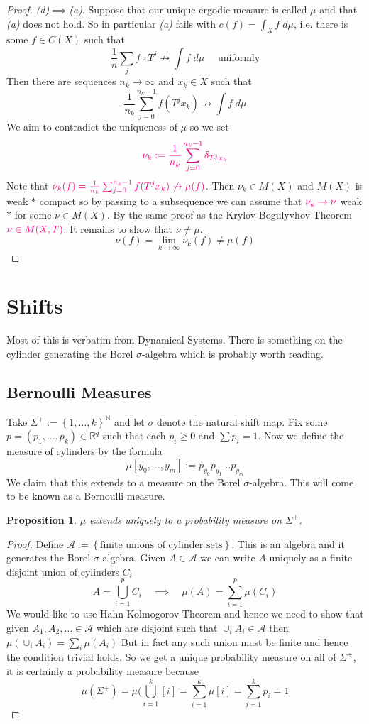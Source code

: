 \documentclass[11pt]{article}
\newcommand{\defeq}{:=}
\newcommand{\R}{\mathbb{R}}
\newcommand{\N}{\mathbb{N}}
\newcommand{\dm}{\;d\mu}
\newcommand{\mdf}[1]{{\color{RoyalBlue} #1}}
\newcommand{\highlight}[1]{{\color{RubineRed} #1}}
\newtheorem{prop}{Proposition}[section]
\begin{document}
\begin{proof}
\textit{(d)}$\implies$\textit{(a)}.
Suppose that our unique ergodic measure is called $\mu$ and that \textit{(a)} does not hold.
So in particular \textit{(a)} fails with $c(f) = \int_X f \dm$, i.e. \highlight{there is some $f\in C(X)$} such that
\[
	\frac{1}{n}\sum_{j}f\circ T^j \not \to \int f \dm \quad\text{ uniformly}
\]
Then there are \highlight{sequences $n_k\to \infty$ and $x_k\in X$} such that
\[
	\frac{1}{n_k}\sum_{j=0}^{n_k-1}f(T^jx_k) \not \to \int f \dm
\]
We aim to contradict the uniqueness of $\mu$ so we set 
\[
	\highlight{\nu_k \defeq \frac{1}{n_k}\sum_{j=0}^{n_k-1}\delta_{T^jx_k}}
\]
Note that $\highlight{ \nu_k(f) = \frac{1}{n_k}\sum_{j=0}^{n_k-1}f(T^jx_k)\not\to\mu(f) }$. 
Then $\nu_k\in M(X)$ and $M(X)$ is weak $\ast$ compact so by passing to a subsequence we can assume that $\highlight{\nu_k\to \nu}$ weak $\ast$ for some $\nu\in M(X)$.
By the same proof as the Krylov-Bogulyvhov Theorem $\highlight{\nu\in M(X, T)}$.
It remains to show that $\nu\neq \mu$.
\[
	\nu(f) =  \lim_{k\to\infty}\nu_k(f) \neq \mu (f)
\]
\end{proof}

\section{Shifts}
Most of this is verbatim from Dynamical Systems.
There is something on the cylinder generating the Borel $\sigma$-algebra which is probably worth reading.

\subsection{Bernoulli Measures}
Take $\Sigma^+ \defeq \left\{ 1, \dots, k\right\}^\N$ and let $\sigma$ denote the natural shift map.
Fix some $p=(p_1, \dots, p_k)\in \R^q$ such that each $p_i\geq 0$ and $\sum p_i=1$.
Now we define the measure of cylinders by the formula 
\[
	\mu[y_0, \dots, y_m] \defeq p_{y_0}p_{y_1}\dots p_{y_m}
\]
We claim that this extends to a measure on the Borel $\sigma$-algebra.
This will come to be known as a \mdf{Bernoulli measure}.

\begin{prop}
$\mu$ extends uniquely to a probability measure on $\Sigma^+$.
\end{prop}

\begin{proof}
Define $\mathcal{A}\defeq\left\{ \text{finite unions of cylinder sets}\right\}$.
This is an algebra and it generates the Borel $\sigma$-algebra.
Given $A\in\mathcal{A}$ we can write $A$ uniquely as a finite disjoint union of cylinders $C_i$
\[
	A = \bigcup_{i=1}^p C_i \quad \implies \quad \mu(A) = \sum_{i=1}^p \mu(C_i)
\]
We would like to use Hahn-Kolmogorov Theorem and hence we need to show that given $A_1, A_2, \dots \in \mathcal{A}$ which are disjoint such that $\cup_i A_i\in\mathcal{A}$ then $\mu(\cup_i A_i) = \sum_{i}\mu(A_i)$
But in fact any such union must be finite and hence the condition trivial holds.
So we get a unique probability measure on all of $\Sigma^+$, it is certainly a probability measure because
\[
	\mu(\Sigma^+) = \mu(\bigcup_{i=1}^k \left[ i\right] = \sum_{i=1}^k \mu\left[ i\right] =\sum_{i=1}^k p_i = 1
\]
\end{proof}
\end{document}
